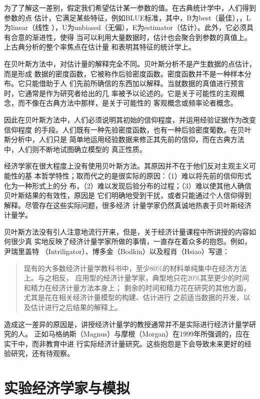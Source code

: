 为了了解这一差别，假定我们希望估计某一参数的值。在古典统计学中，人们得到参数的点
估计，它满足某些特征，例如BLUE标准，其中，B为best（最佳），，L为linear（线性
），U为unbiased（无偏），E为estimator（估计）。此外，它必须具有合意的渐进性，使得
当可以利用大量数据时，估计也会聚合到参数的真值上。上古典分析的整个率焦点在估计量
和表明其特征的统计学上。

在贝叶斯方法中，对估计量的解释完全不同。贝叶斯分析不是产生数据的点估计，而是形成
数据的密度函数，它被称作后验密度函数。密度函数并不是一种样本分布。它只能借助于人
们先前所确信的东西加以解释。当就数据的真值进行预言时，它通常是作为研究者给出的几
率被予以论述的。它是关于可能性的主观概念，而不像在古典方法中那样，是关于可能性的
客观概念或频率论者概念。

因此在贝叶斯方法中，人们必须说明其初始的信仰程度，并运用经验证据作为改变信仰程度
的手段。人们既有一种先验密度函数，也有一种后验密度葡数。在贝叶斯分析中，人们只是
简单地运用经验数据来修正其先前的信仰，而在古典方法中，人们则不断地试图确立模型的
真正性质。

经济学家在很大程度上没有使用贝叶斯方法。其原因并不在于他们反对主观主义可能性的基
本哲学特性；取而代之的是很实际的原因：（1）难以将先前的信仰形式化为一种形式上的分
布，（2）难以发现后验分布的过程；（3）难以使其他人确信贝叶斯结果的有效性，原因是
它们明确地受到干扰，或者只能通过个人信仰得到解释。尽管存在这些实际问题，很多经济
计量学家仍然真诚地热衷于贝叶斯经济计量学。

贝叶斯方法没有引人注意地流行开来，但是，关于经济计量课程中所讲授的内容如何很少真
实地反映了经济计量学家所做的事情，一直存在着众多的抱怨。例如，尹瑞里盖特
（Intriligator）、博多金（Bodkin）以及程肖（Hsiao）写道：

\begin{quotation}
  现有的大多数经济计量学教科书中，至少80\%的材料单纯集中在经济方法上。与之相反，
  应用型的经济计量学家，典型地只花20\%其至更少的时间和精力在经济计量方法本身上；
  剩余的时间和精力花在研究的其他方面，尤其是花在相关经济计量模型的构建、估计进行
  之前适当数据的开发，以及估计进行之后结果的解释上。
\end{quotation}

造成这一差异的原因是，讲授经济计量学的教授通常并不是实际进行经济计量学研究的人。
正如马格纳斯（Magnus）与摩根（Morgan）在1999年所强调的，应在实干中，而非教育中进
行实际经济计量研究。这些抱怨是下会导致未来更好的经验研究，还有待观察。

\section{实验经济学家与模拟}

